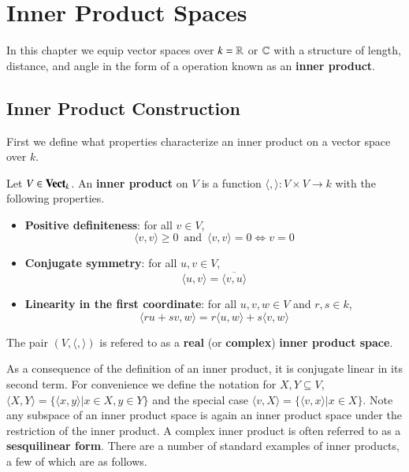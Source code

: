 \chapter{Inner Product Spaces}\label{InnerProd}

In this chapter we equip vector spaces over $k = \mathbb R$ or $\mathbb C$ with a structure of length, distance, and angle in the form of a operation known as an \textbf{inner product}.

\section{Inner Product Construction}\label{sec:InnerProd}

First we define what properties characterize an inner product on a vector space over $k$.

\begin{definition}
    Let $V \in \normalfont\textbf{Vect}_{k}$. An \textbf{inner product} on $V$ is a function $\langle ,\rangle:V\times V\rightarrow k$ with the following properties. \begin{itemize}
        \item \textbf{Positive definiteness}: for all $v \in V$, \begin{equation*}
            \langle v,v\rangle \geq 0\,\text{ and }\,\langle v,v\rangle = 0\iff v = 0
            \end{equation*}
        \item \textbf{Conjugate symmetry}: for all $u,v \in V$, \begin{equation*}
            \langle u,v\rangle = \overline{\langle v,u\rangle}
        \end{equation*}
        \item \textbf{Linearity in the first coordinate}: for all $u,v,w\in V$ and $r,s \in k$, \begin{equation*}
            \langle ru+sv,w\rangle = r\langle u,w\rangle + s\langle v,w\rangle
        \end{equation*}
    \end{itemize}
    The pair $(V,\langle,\rangle)$ is refered to as a \textbf{real} (or \textbf{complex}) \textbf{inner product space}.
\end{definition}


As a consequence of the definition of an inner product, it is conjugate linear in its second term. For convenience we define the notation for $X,Y \subseteq V$, $\langle X,Y\rangle = \{\langle x,y\rangle|x\in X,y\in Y\}$ and the special case $\langle v,X\rangle = \{\langle v,x\rangle |x\in X\}$. Note any subspace of an inner product space is again an inner product space under the restriction of the inner product. A complex inner product is often referred to as a \textbf{sesquilinear form}. There are a number of standard examples of inner products, a few of which are as follows.

